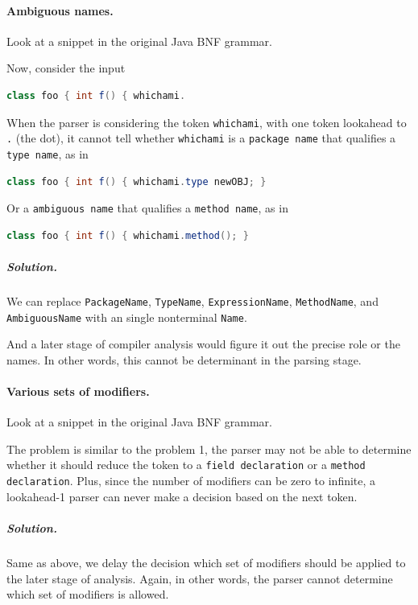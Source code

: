 \documentclass[12pt]{article}
\begin{document}
\paragraph{Ambiguous names.}
Look at a snippet in the original Java BNF grammar.



Now, consider the input

\begin{lstlisting}[language=Java]
class foo { int f() { whichami.
\end{lstlisting}

When the parser is considering the token \texttt{whichami}, with one token lookahead to \texttt{.} (the dot), it cannot tell whether \texttt{whichami} is a \texttt{package name} that qualifies a \texttt{type name}, as in

\begin{lstlisting}[language=Java]
class foo { int f() { whichami.type newOBJ; }
\end{lstlisting}

Or a \texttt{ambiguous name} that qualifies a \texttt{method name}, as in

\begin{lstlisting}[language=Java]
class foo { int f() { whichami.method(); }
\end{lstlisting}

\subparagraph{Solution.} We can replace \texttt{PackageName}, \texttt{TypeName}, \texttt{ExpressionName}, \texttt{MethodName}, and \texttt{AmbiguousName} with an single nonterminal \texttt{Name}.



And a later stage of compiler analysis would figure it out the precise role or the names. In other words, this cannot be determinant in the parsing stage.

\paragraph{Various sets of modifiers.}
Look at a snippet in the original Java BNF grammar.

The problem is similar to the problem 1, the parser may not be able to determine whether it should reduce the token to a \texttt{field declaration} or a \texttt{method declaration}. Plus, since the number of modifiers can be zero to infinite, a lookahead-1 parser can never make a decision based on the next token.
\subparagraph{Solution.} Same as above, we delay the decision which set of modifiers should be applied to the later stage of analysis. Again, in other words, the parser cannot determine which set of modifiers is allowed.
\end{document}
